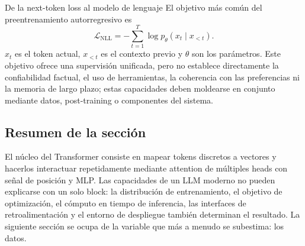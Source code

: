 \begin{knowledgebox}{De la next-token loss al modelo de lenguaje}
El objetivo más común del preentrenamiento autorregresivo es
\[
\mathcal{L}_{\text{NLL}}=-\sum_{t=1}^{T}\log p_{\theta}(x_t\mid x_{<t}).
\]
$x_t$ es el token actual, $x_{<t}$ es el contexto previo y $\theta$ son los parámetros. Este objetivo ofrece una supervisión unificada, pero no establece directamente la confiabilidad factual, el uso de herramientas, la coherencia con las preferencias ni la memoria de largo plazo; estas capacidades deben moldearse en conjunto mediante datos, post-training o componentes del sistema.
\end{knowledgebox}

\subsection{Resumen de la sección}

El núcleo del Transformer consiste en mapear tokens discretos a vectores y hacerlos interactuar repetidamente mediante attention de múltiples heads con señal de posición y MLP. Las capacidades de un LLM moderno no pueden explicarse con un solo block: la distribución de entrenamiento, el objetivo de optimización, el cómputo en tiempo de inferencia, las interfaces de retroalimentación y el entorno de despliegue también determinan el resultado. La siguiente sección se ocupa de la variable que más a menudo se subestima: los datos.
